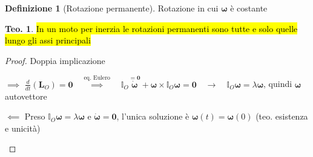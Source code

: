 \documentclass[a4paper,10pt]{article}
\theoremstyle{definition}
\newcommand{\bv}{\boldsymbol} %
\theoremstyle{indentdefinition}
\newtheorem{defn}{Definizione}[section]
\theoremstyle{indenttheorem}
\newtheorem{thm}{Teo.}
\theoremstyle{myremark}
\theoremstyle{indentgeneral}
\newenvironment{lyxlist}[1]
	{\begin{list}{}
		{\settowidth{\labelwidth}{#1}
		 \setlength{\leftmargin}{\labelwidth}
		 \addtolength{\leftmargin}{\labelsep}
		 \renewcommand{\makelabel}[1]{##1\hfil}}}
	{\end{list}}
\begin{document}
\begin{defn}[Rotazione permanente]
    Rotazione in cui $\bv{\omega}$ è costante
\end{defn}

\begin{thm}
\hl{In un moto per inerzia le rotazioni permanenti sono tutte e solo quelle
lungo gli assi principali}
\end{thm}

\begin{proof}
Doppia implicazione
\begin{lyxlist}{00.00.0000}
\item [{$\implies$}] $\frac{d}{dt}\left(\boldsymbol{L}_{O}\right)=\boldsymbol{0}\quad\overset{\text{eq. Eulero}}{\implies}\quad\mathbb{I}_{O}\overset{=\boldsymbol{0}}{\boxed{\dot{\boldsymbol{\omega}}}}+\boldsymbol{\omega}\times\mathbb{I}_{O}\boldsymbol{\omega}=\boldsymbol{0}\quad\rightarrow\quad\mathbb{I}_{O}\boldsymbol{\omega}=\lambda\boldsymbol{\omega}$,
quindi $\boldsymbol{\omega}$ autovettore
\item [{$\impliedby$}] Preso $\mathbb{I}_{O}\boldsymbol{\omega}=\lambda\boldsymbol{\omega}$
e $\dot{\boldsymbol{\omega}}=\boldsymbol{0}$, l'unica soluzione è
$\boldsymbol{\omega}\left(t\right)=\boldsymbol{\omega}\left(0\right)$ (teo. esistenza e unicità)
\end{lyxlist}
\end{proof}
\end{document}
